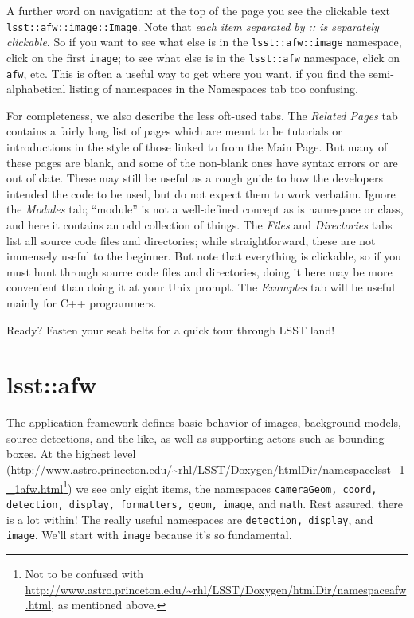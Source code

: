 \documentclass{book}
\begin{document}
A further word on navigation: at the top of the page you see the
clickable text \texttt{lsst::afw::image::Image}.  Note that {\it each
  item separated by :: is separately clickable}.  So if you want to
see what else is in the \texttt{lsst::afw::image} namespace, click on
the first \texttt{image}; to see what else is in the
\texttt{lsst::afw} namespace, click on \texttt{afw}, etc.  This is
often a useful way to get where you want, if you find the
semi-alphabetical listing of namespaces in the Namespaces tab too
confusing.

For completeness, we also describe the less oft-used tabs.  The {\it
  Related Pages} tab contains a fairly long list of pages which are
meant to be tutorials or introductions in the style of those linked to
from the Main Page.  But many of these pages are blank, and some of
the non-blank ones have syntax errors or are out of date.  These may
still be useful as a rough guide to how the developers intended the
code to be used, but do not expect them to work verbatim.  Ignore the
{\it Modules} tab; ``module'' is not a well-defined concept as is
namespace or class, and here it contains an odd collection of things.
The {\it Files} and {\it Directories} tabs list all source code files and
directories; while straightforward, these are not immensely useful to
the beginner.  But note that everything is clickable, so if you must
hunt through source code files and directories, doing it here may be
more convenient than doing it at your Unix prompt.  The {\it Examples}
tab will be useful mainly for C++ programmers.

Ready?  Fasten your seat belts for a quick tour through LSST land!

\section{lsst::afw}

The application framework defines basic behavior of images, background
models, source detections, and the like, as well as supporting actors
such as bounding boxes. At the highest level (\url{http://www.astro.princeton.edu/~rhl/LSST/Doxygen/htmlDir/namespacelsst_1_1afw.html}\footnote{Not
  to be confused with
  \url{http://www.astro.princeton.edu/~rhl/LSST/Doxygen/htmlDir/namespaceafw.html},
  as mentioned above.}) we see only eight items, the namespaces
\texttt{cameraGeom, coord, detection, display, formatters, geom,
  image}, and \texttt{math}.  Rest assured, there is a lot within!
The really useful namespaces are \texttt{detection, display}, and
\texttt{image}.  We'll start with \texttt{image} because it's so
fundamental.
\end{document}

